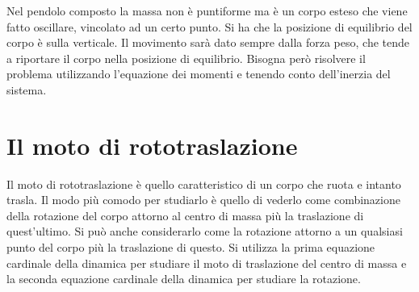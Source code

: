 \documentclass[10pt,a4paper]{book}
\begin{document}
\FloatBarrier
Nel pendolo composto la massa non è puntiforme ma è un corpo esteso che viene fatto oscillare, vincolato ad un certo punto. Si ha che la posizione di equilibrio del corpo è sulla verticale. Il movimento sarà dato sempre dalla forza peso, che tende a riportare il corpo nella posizione di equilibrio. Bisogna però risolvere il problema
utilizzando l'equazione dei momenti e tenendo conto dell'inerzia del sistema.







































\section{Il moto di rototraslazione}

Il moto di rototraslazione è quello caratteristico di un corpo che ruota e intanto trasla. Il modo più comodo per studiarlo è quello di vederlo come combinazione della rotazione del corpo attorno al centro di massa più la traslazione di quest'ultimo. Si può anche considerarlo come la rotazione attorno a un qualsiasi punto del corpo più la traslazione di questo. Si utilizza la prima equazione cardinale della dinamica per studiare il moto di traslazione del centro di massa e la seconda equazione cardinale della dinamica per studiare la rotazione.
\end{document}

